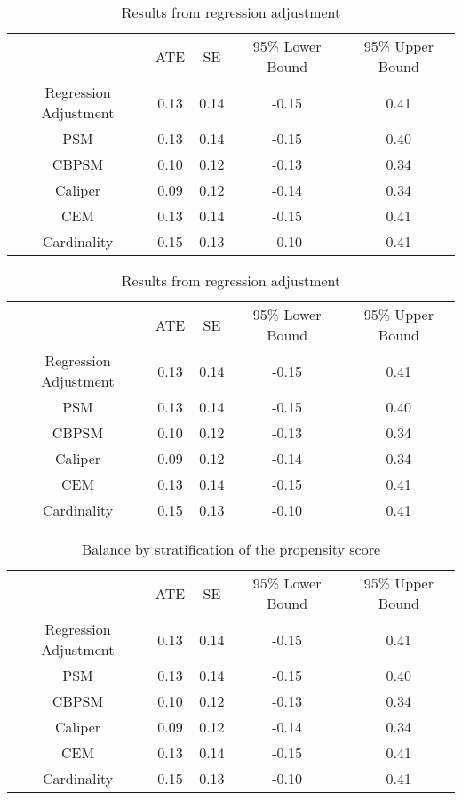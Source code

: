 \documentclass{article}
\begin{document}
\begin{table}[t]
\caption{Results from regression adjustment} \label{tbRA3}
\footnotesize
\centering
{\tabcolsep=16.5pt
\begin{tabular}{c||c|c|c|c}
\hline
& ATE & SE & 95\% Lower Bound & 95\% Upper Bound \\ \hhline{=#=|=|=|=}
Regression Adjustment & 0.13 & 0.14 & -0.15 & 0.41 \\ \hline
PSM & 0.13 & 0.14 & -0.15 & 0.40 \\ \hline
CBPSM & 0.10 & 0.12 & -0.13 & 0.34 \\ \hline
Caliper & 0.09 & 0.12 & -0.14 & 0.34 \\ \hline
CEM & 0.13 & 0.14 & -0.15 & 0.41 \\ \hline
Cardinality & 0.15 & 0.13 & -0.10 & 0.41 \\ \hline
\end{tabular}}
\end{table}

\begin{table}[t]
\caption{Results from regression adjustment} \label{tbRA4}
\footnotesize
\centering
{\tabcolsep=16.5pt
\begin{tabular}{c||c|c|c|c}
\hline
& ATE & SE & 95\% Lower Bound & 95\% Upper Bound \\ \hhline{=#=|=|=|=}
Regression Adjustment & 0.13 & 0.14 & -0.15 & 0.41 \\ \hline
PSM & 0.13 & 0.14 & -0.15 & 0.40 \\ \hline
CBPSM & 0.10 & 0.12 & -0.13 & 0.34 \\ \hline
Caliper & 0.09 & 0.12 & -0.14 & 0.34 \\ \hline
CEM & 0.13 & 0.14 & -0.15 & 0.41 \\ \hline
Cardinality & 0.15 & 0.13 & -0.10 & 0.41 \\ \hline
\end{tabular}}
\end{table}

\begin{table}[t]
\caption{Balance by stratification of the propensity score} \label{tbRA5}
\footnotesize
\centering
{\tabcolsep=16.5pt
\begin{tabular}{c||c|c|c|c}
\hline
& ATE & SE & 95\% Lower Bound & 95\% Upper Bound \\ \hhline{=#=|=|=|=}
Regression Adjustment & 0.13 & 0.14 & -0.15 & 0.41 \\ \hline
PSM & 0.13 & 0.14 & -0.15 & 0.40 \\ \hline
CBPSM & 0.10 & 0.12 & -0.13 & 0.34 \\ \hline
Caliper & 0.09 & 0.12 & -0.14 & 0.34 \\ \hline
CEM & 0.13 & 0.14 & -0.15 & 0.41 \\ \hline
Cardinality & 0.15 & 0.13 & -0.10 & 0.41 \\ \hline
\end{tabular}}
\end{table}
\end{document}
